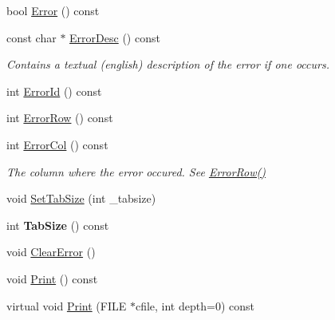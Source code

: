 \begin{DoxyCompactItemize}
\item 
bool \hyperlink{class_ti_xml_document_a6dfc01a6e5d58e56acd537dfd3bdeb29}{\-Error} () const 
\item 
\hypertarget{class_ti_xml_document_a9d0f689f6e09ea494ea547be8d79c25e}{const char $\ast$ \hyperlink{class_ti_xml_document_a9d0f689f6e09ea494ea547be8d79c25e}{\-Error\-Desc} () const }\label{class_ti_xml_document_a9d0f689f6e09ea494ea547be8d79c25e}

\begin{DoxyCompactList}\small\item\em \-Contains a textual (english) description of the error if one occurs. \end{DoxyCompactList}\item 
int \hyperlink{class_ti_xml_document_af96fc2f3f9ec6422782bfe916c9e778f}{\-Error\-Id} () const 
\item 
int \hyperlink{class_ti_xml_document_af30efc75e804aa2e92fb8be3a8cb676e}{\-Error\-Row} () const 
\item 
\hypertarget{class_ti_xml_document_aa90bc630ee5203c6109ca5fad3323649}{int \hyperlink{class_ti_xml_document_aa90bc630ee5203c6109ca5fad3323649}{\-Error\-Col} () const }\label{class_ti_xml_document_aa90bc630ee5203c6109ca5fad3323649}

\begin{DoxyCompactList}\small\item\em \-The column where the error occured. \-See \hyperlink{class_ti_xml_document_af30efc75e804aa2e92fb8be3a8cb676e}{\-Error\-Row()} \end{DoxyCompactList}\item 
void \hyperlink{class_ti_xml_document_a51dac56316f89b35bdb7d0d433ba988e}{\-Set\-Tab\-Size} (int \-\_\-tabsize)
\item 
\hypertarget{class_ti_xml_document_a612360241b85bad0826b2a9ae9cda561}{int {\bfseries \-Tab\-Size} () const }\label{class_ti_xml_document_a612360241b85bad0826b2a9ae9cda561}

\item 
void \hyperlink{class_ti_xml_document_ac66b8c28db86363315712a3574e87c35}{\-Clear\-Error} ()
\item 
void \hyperlink{class_ti_xml_document_af08389ec70ee9b2de7f800e206a18510}{\-Print} () const 
\item 
\hypertarget{class_ti_xml_document_a7b1aea204fee266b70b9c105c8bf2ada}{virtual void \hyperlink{class_ti_xml_document_a7b1aea204fee266b70b9c105c8bf2ada}{\-Print} (\-F\-I\-L\-E $\ast$cfile, int depth=0) const }\label{class_ti_xml_document_a7b1aea204fee266b70b9c105c8bf2ada}


\end{DoxyCompactItemize}
